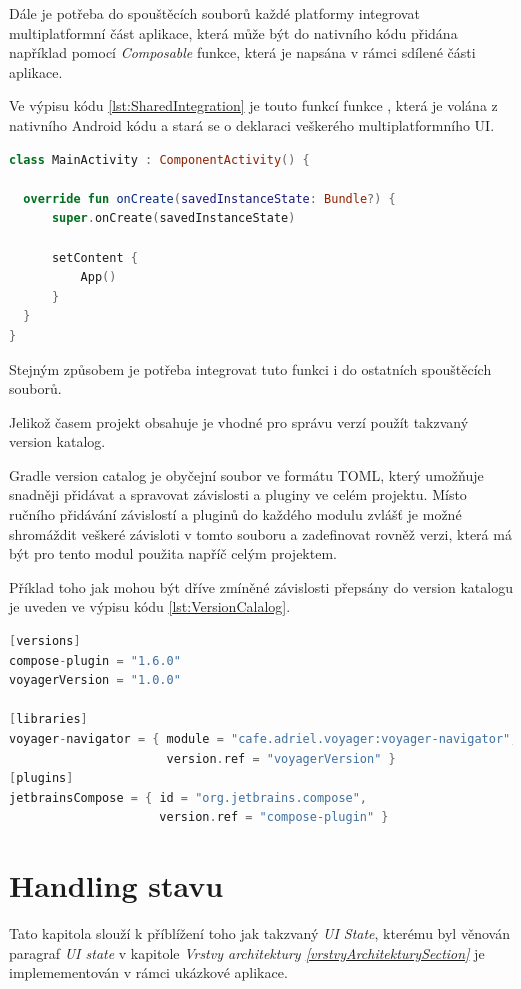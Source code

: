 Dále je potřeba do spouštěcích souborů každé platformy integrovat multiplatformní část aplikace, která může být do nativního kódu přidána
například pomocí \textit{Composable} funkce, která je napsána v rámci sdílené části aplikace.

Ve výpisu kódu \ref{lst:SharedIntegration} je touto funkcí funkce , která je volána z nativního Android kódu a stará se
o deklaraci veškerého multiplatformního UI.

\begin{lstlisting}[caption={Lib integration}, label={lst:SharedIntegration}, language=Kotlin]
class MainActivity : ComponentActivity() {

  override fun onCreate(savedInstanceState: Bundle?) {
      super.onCreate(savedInstanceState)

      setContent {
          App()
      }
  }
}
\end{lstlisting}

Stejným způsobem je potřeba integrovat tuto funkci i do ostatních spouštěcích souborů. 



Jelikož časem projekt obsahuje je vhodné pro správu verzí použít takzvaný version katalog. 

Gradle version catalog je obyčejní soubor ve formátu TOML, který umožňuje snadněji přidávat a spravovat závislosti a pluginy ve celém projektu. 
Místo ručního přidávání závislostí a pluginů do každého modulu zvlášť je možné shromáždit veškeré závisloti v tomto souboru a zadefinovat rovněž
verzi, která má být pro tento modul použita napříč celým projektem. 

Příklad toho jak mohou být dříve zmíněné závislosti přepsány do version
katalogu je uveden ve výpisu kódu \ref{lst:VersionCalalog}.

\begin{lstlisting}[caption={Version katalog}, label={lst:VersionCalalog}, language=Kotlin]
[versions]
compose-plugin = "1.6.0"
voyagerVersion = "1.0.0"

[libraries]
voyager-navigator = { module = "cafe.adriel.voyager:voyager-navigator", 
                      version.ref = "voyagerVersion" }
[plugins]
jetbrainsCompose = { id = "org.jetbrains.compose",
                     version.ref = "compose-plugin" }

\end{lstlisting}

\section{Handling stavu}
Tato kapitola slouží k příblížení toho jak takzvaný \textit{UI State}, kterému byl věnován paragraf \textit{UI state} v 
kapitole \textit{Vrstvy architektury \ref{vrstvyArchitekturySection} } je implemementován v rámci ukázkové aplikace.

